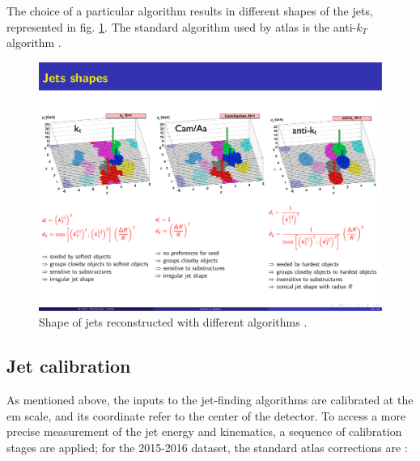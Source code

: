 The choice of a particular algorithm results in different shapes of the jets, represented in fig. \ref{fig:jetsalg}. The standard algorithm used by \gls{atlas} is the anti-$k_T$ algorithm \cite{cacciari:antikt}.

\begin{figure}[h]
\includegraphics[width=\textwidth]{./figures/objects/jetsalg.pdf}
\caption[Shape of jets reconstructed with different algorithms]{Shape of jets reconstructed with different algorithms \cite{cacciari:antikt}.}
\label{fig:jetsalg}
\end{figure}

\subsection{Jet calibration}
\label{sec:obj:jetcalib}

As mentioned above, the inputs to the jet-finding algorithms are calibrated at the \gls{em} scale, and its coordinate refer to the center of the detector. To access a more precise measurement of the jet energy and kinematics, a sequence of calibration stages are applied; for the 2015-2016 dataset, the standard \gls{atlas} corrections are \cite{PhysRevD.96.072002}:


